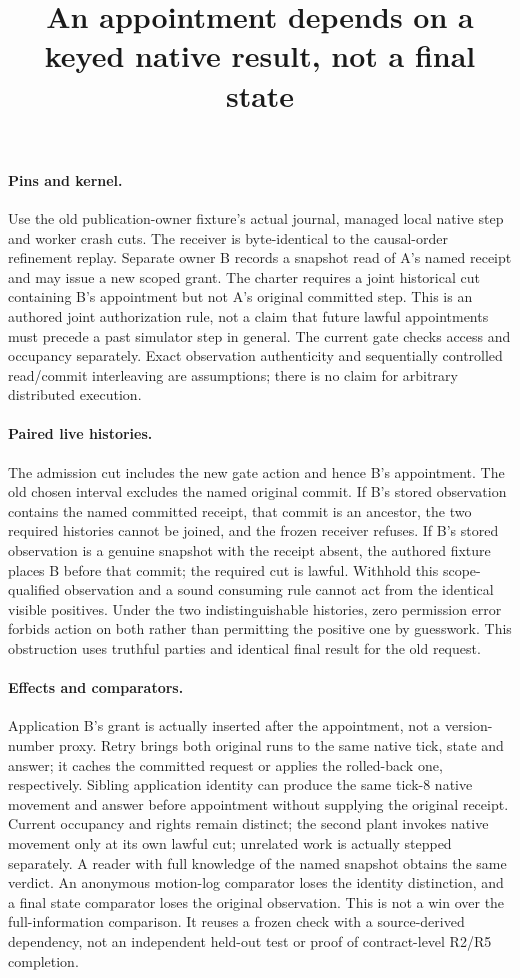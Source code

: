 \documentclass{article}
\title{An appointment depends on a keyed native result, not a final state}
\begin{document}
\maketitle
\paragraph{Pins and kernel.}
Use the old publication-owner fixture's actual journal, managed local native step and worker crash cuts. The receiver is byte-identical to the causal-order refinement replay. Separate owner B records a snapshot read of A's named receipt and may issue a new scoped grant. The charter requires a joint historical cut containing B's appointment but not A's original committed step. This is an authored joint authorization rule, not a claim that future lawful appointments must precede a past simulator step in general. The current gate checks access and occupancy separately. Exact observation authenticity and sequentially controlled read/commit interleaving are assumptions; there is no claim for arbitrary distributed execution.

\paragraph{Paired live histories.}
The admission cut includes the new gate action and hence B's appointment. The old chosen interval excludes the named original commit. If B's stored observation contains the named committed receipt, that commit is an ancestor, the two required histories cannot be joined, and the frozen receiver refuses. If B's stored observation is a genuine snapshot with the receipt absent, the authored fixture places B before that commit; the required cut is lawful. Withhold this scope-qualified observation and a sound consuming rule cannot act from the identical visible positives. Under the two indistinguishable histories, zero permission error forbids action on both rather than permitting the positive one by guesswork. This obstruction uses truthful parties and identical final result for the old request.

\paragraph{Effects and comparators.}
Application B's grant is actually inserted after the appointment, not a version-number proxy. Retry brings both original runs to the same native tick, state and answer; it caches the committed request or applies the rolled-back one, respectively. Sibling application identity can produce the same tick-8 native movement and answer before appointment without supplying the original receipt. Current occupancy and rights remain distinct; the second plant invokes native movement only at its own lawful cut; unrelated work is actually stepped separately. A reader with full knowledge of the named snapshot obtains the same verdict. An anonymous motion-log comparator loses the identity distinction, and a final state comparator loses the original observation. This is not a win over the full-information comparison. It reuses a frozen check with a source-derived dependency, not an independent held-out test or proof of contract-level R2/R5 completion.
\end{document}
